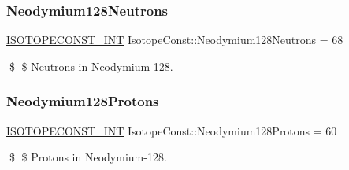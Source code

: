 \subsubsection{\texorpdfstring{Neodymium128\+Neutrons}{Neodymium128Neutrons}}
{\footnotesize\ttfamily \mbox{\hyperlink{group___isotope_const-_macros_ga5f18360b3e99483a35c32d789e62621c}{I\+S\+O\+T\+O\+P\+E\+C\+O\+N\+S\+T\+\_\+\+I\+NT}} Isotope\+Const\+::\+Neodymium128\+Neutrons = 68}

\$ \$ Neutrons in Neodymium-\/128. \mbox{\label{group___isotope_const-_neodymium-_nd128_gafa3264e6e0f315b47805900c3030b6a1}} 
\subsubsection{\texorpdfstring{Neodymium128\+Protons}{Neodymium128Protons}}
{\footnotesize\ttfamily \mbox{\hyperlink{group___isotope_const-_macros_ga5f18360b3e99483a35c32d789e62621c}{I\+S\+O\+T\+O\+P\+E\+C\+O\+N\+S\+T\+\_\+\+I\+NT}} Isotope\+Const\+::\+Neodymium128\+Protons = 60}

\$ \$ Protons in Neodymium-\/128. 